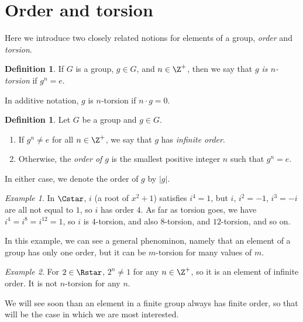\documentclass[12pt]{amsart}
\theoremstyle{plain}
\theoremstyle{definition}
\newtheorem{defn}[thm]{Definition}
\theoremstyle{remark}
\newtheorem*{exam}{Example}
\begin{document}
\section{Order and torsion}
Here we introduce two closely related notions for elements of a group, \emph{order}
and \emph{torsion}.

\begin{defn}
If $G$ is a group, $g\in G$, and $n\in\Z^+$, then we say that \emph{$g$ is $n$-torsion}
if $g^n=e$.
\end{defn}
In additive notation, $g$ is $n$-torsion if $n\cdot g=0$.

\begin{defn}
  Let $G$ be a group and $g\in G$.
  \begin{enumerate}
  \item If $g^n\neq e$ for all $n\in\Z^+$, we say that $g$ has \emph{infinite order}.
  \item Otherwise, the \emph{order of $g$} is the smallest positive integer $n$ such that
  $g^n=e$.
  \end{enumerate}
  In either case, we denote the order of $g$ by $|g|$.
\end{defn}

\begin{exam}
  In $\Cstar$, $i$ (a root of $x^2+1$) satisfies $i^4=1$, but
  $i$, $i^2=-1$, $i^3=-i$ are all not equal to $1$, so $i$ has order $4$.  
  As far as torsion
  goes, we have $i^4=i^8=i^{12}=1$, so $i$ is $4$-torsion, and also 
  $8$-torsion, and $12$-torsion, and so on.
\end{exam}
In this example, we can see a general phenominon, namely that an element
of a group has only one order, but it can be $m$-torsion for many values
of $m$.

\begin{exam}
For $2\in \Rstar$, $2^n\neq 1$ for any $n\in\Z^+$, so it is an element 
of infinite order.  It is not $n$-torsion for any $n$.
\end{exam}

We will see soon than an element in a finite group always has finite order, so that will
be the case in which we are most interested.
\end{document}
